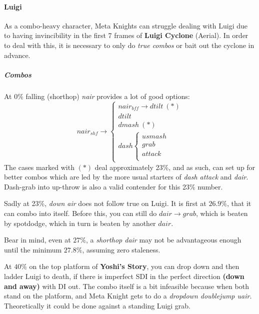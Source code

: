 \paragraph{Luigi}

As a combo-heavy character, Meta Knights can struggle dealing with Luigi due to having invincibility in the first 7 frames of \textbf{Luigi Cyclone} (Aerial). In order to deal with this, it is necessary to only do \textit{true combos} or bait out the cyclone in advance.

\subparagraph{Combos}
At 0\% falling (shorthop) \textit{nair} provides a lot of good options:
\[
	nair_{shf} \to \begin{cases}
	nair_{bff} \to dtilt \ (*)	\\	
	dtilt	\\
	dmash \ (*)	\\
	dash 
	\begin{cases}
		usmash	\\
		grab	\\
		attack	\\
	\end{cases}
	\end{cases}
\]
The cases marked with $(*)$ deal approximately 23\%, and as such, can set up for better combos which are led by the more usual starters of \textit{dash attack} and \textit{dair}. Dash-grab into up-throw is also a valid contender for this 23\% number. 

Sadly at 23\%, \textit{down air} does not follow true on Luigi. It is first at $26.9\%$, that it can combo into itself. Before this, you can still do $dair \to grab$, which is beaten by spotdodge, which in turn is beaten by another $dair$.

Bear in mind, even at $27\%$, a \textit{shorthop dair} may not be advantageous enough until the minimum $27.8\%$, assuming zero staleness.

At $40\%$ on the top platform of \textbf{Yoshi's Story}, you can drop down and then ladder Luigi to death, if there is imperfect SDI in the perfect direction \textbf{(down and away)} with DI out. The combo itself is a bit infeasible because when both stand on the platform, and Meta Knight gets to do a \textit{dropdown doublejump uair}. Theoretically it could be done against a standing Luigi grab.